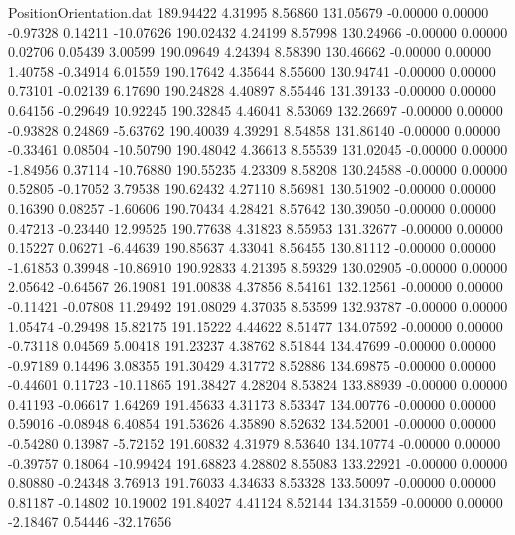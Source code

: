 \begin{filecontents}{PositionOrientation.dat}
 189.94422    4.31995    8.56860   131.05679   -0.00000    0.00000   -0.97328    0.14211  -10.07626
 190.02432    4.24199    8.57998   130.24966   -0.00000    0.00000    0.02706    0.05439    3.00599
 190.09649    4.24394    8.58390   130.46662   -0.00000    0.00000    1.40758   -0.34914    6.01559
 190.17642    4.35644    8.55600   130.94741   -0.00000    0.00000    0.73101   -0.02139    6.17690
 190.24828    4.40897    8.55446   131.39133   -0.00000    0.00000    0.64156   -0.29649   10.92245
 190.32845    4.46041    8.53069   132.26697   -0.00000    0.00000   -0.93828    0.24869   -5.63762
 190.40039    4.39291    8.54858   131.86140   -0.00000    0.00000   -0.33461    0.08504  -10.50790
 190.48042    4.36613    8.55539   131.02045   -0.00000    0.00000   -1.84956    0.37114  -10.76880
 190.55235    4.23309    8.58208   130.24588   -0.00000    0.00000    0.52805   -0.17052    3.79538
 190.62432    4.27110    8.56981   130.51902   -0.00000    0.00000    0.16390    0.08257   -1.60606
 190.70434    4.28421    8.57642   130.39050   -0.00000    0.00000    0.47213   -0.23440   12.99525
 190.77638    4.31823    8.55953   131.32677   -0.00000    0.00000    0.15227    0.06271   -6.44639
 190.85637    4.33041    8.56455   130.81112   -0.00000    0.00000   -1.61853    0.39948  -10.86910
 190.92833    4.21395    8.59329   130.02905   -0.00000    0.00000    2.05642   -0.64567   26.19081
 191.00838    4.37856    8.54161   132.12561   -0.00000    0.00000   -0.11421   -0.07808   11.29492
 191.08029    4.37035    8.53599   132.93787   -0.00000    0.00000    1.05474   -0.29498   15.82175
 191.15222    4.44622    8.51477   134.07592   -0.00000    0.00000   -0.73118    0.04569    5.00418
 191.23237    4.38762    8.51844   134.47699   -0.00000    0.00000   -0.97189    0.14496    3.08355
 191.30429    4.31772    8.52886   134.69875   -0.00000    0.00000   -0.44601    0.11723  -10.11865
 191.38427    4.28204    8.53824   133.88939   -0.00000    0.00000    0.41193   -0.06617    1.64269
 191.45633    4.31173    8.53347   134.00776   -0.00000    0.00000    0.59016   -0.08948    6.40854
 191.53626    4.35890    8.52632   134.52001   -0.00000    0.00000   -0.54280    0.13987   -5.72152
 191.60832    4.31979    8.53640   134.10774   -0.00000    0.00000   -0.39757    0.18064  -10.99424
 191.68823    4.28802    8.55083   133.22921   -0.00000    0.00000    0.80880   -0.24348    3.76913
 191.76033    4.34633    8.53328   133.50097   -0.00000    0.00000    0.81187   -0.14802   10.19002
 191.84027    4.41124    8.52144   134.31559   -0.00000    0.00000   -2.18467    0.54446  -32.17656

\end{filecontents}
